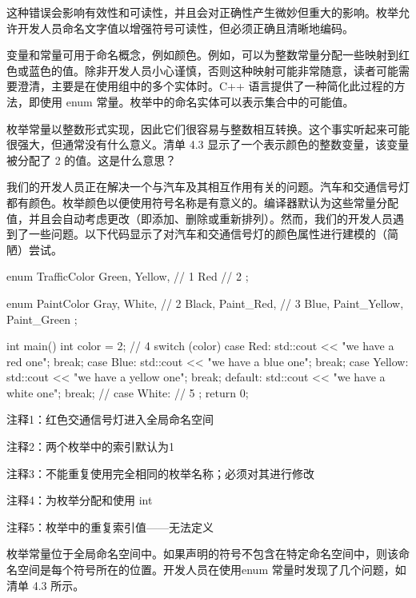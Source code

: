 这种错误会影响有效性和可读性，并且会对正确性产生微妙但重大的影响。枚举允许开发人员命名文字值以增强符号可读性，但必须正确且清晰地编码。


变量和常量可用于命名概念，例如颜色。例如，可以为整数常量分配一些映射到红色或蓝色的值。除非开发人员小心谨慎，否则这种映射可能非常随意，读者可能需要澄清，主要是在使用组中的多个实体时。C++ 语言提供了一种简化此过程的方法，即使用 enum 常量。枚举中的命名实体可以表示集合中的可能值。

枚举常量以整数形式实现，因此它们很容易与整数相互转换。这个事实听起来可能很强大，但通常没有什么意义。清单 4.3 显示了一个表示颜色的整数变量，该变量被分配了 2 的值。这是什么意思？

我们的开发人员正在解决一个与汽车及其相互作用有关的问题。汽车和交通信号灯都有颜色。枚举颜色以便使用符号名称是有意义的。编译器默认为这些常量分配值，并且会自动考虑更改（即添加、删除或重新排列）。然而，我们的开发人员遇到了一些问题。以下代码显示了对汽车和交通信号灯的颜色属性进行建模的（简陋）尝试。


\begin{cpp}
enum TrafficColor {
  Green,
  Yellow, // 1
  Red // 2
};

enum PaintColor {
  Gray,
  White, // 2
  Black,
  Paint_Red, // 3
  Blue,
  Paint_Yellow,
  Paint_Green
};

int main() {
  int color = 2; // 4
  switch (color) {
  case Red:
    std::cout << "we have a red one\n";
    break;
  case Blue:
    std::cout << "we have a blue one\n";
    break;
  case Yellow:
    std::cout << "we have a yellow one\n";
    break;
  default:
    std::cout << "we have a white one\n";
    break;
  // case White: // 5
  };
  return 0;
}
\end{cpp}

{\footnotesize
注释1：红色交通信号灯进入全局命名空间

注释2：两个枚举中的索引默认为1

注释3：不能重复使用完全相同的枚举名称；必须对其进行修改

注释4：为枚举分配和使用 int

注释5：枚举中的重复索引值——无法定义
}


枚举常量位于全局命名空间中。如果声明的符号不包含在特定命名空间中，则该命名空间是每个符号所在的位置。开发人员在使用enum 常量时发现了几个问题，如清单 4.3 所示。

